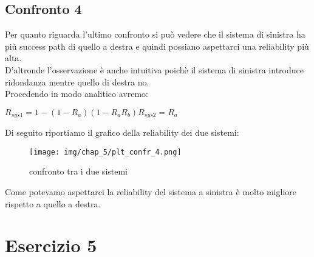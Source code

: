 \subsection{Confronto 4}
Per quanto riguarda l'ultimo confronto si può vedere che il sistema di sinistra ha più success path di quello a destra e quindi possiano aspettarci una reliability più alta.\\
D'altronde l'osservazione è anche intuitiva poichè il sistema di sinistra introduce ridondanza mentre quello di destra no.\\
Procedendo in modo analitico avremo:
\begin{center}
    $
    R_{sys1} = 1-(1-R_a)(1-R_a R_b)
    R_{sys2} = R_a 
    $ 
\end{center}
Di seguito riportiamo il grafico della reliability dei due sistemi:
\begin{figure}[H]
    \centering
    \texttt{[image: img/chap\_5/plt\_confr\_4.png]}
    \caption{confronto tra i due sistemi}
    \label{fig:cofr4_sys}
\end{figure}
\noindent
Come potevamo aspettarci la reliability del sistema a sinistra è molto migliore rispetto a quello a destra.
\section{Esercizio 5}

